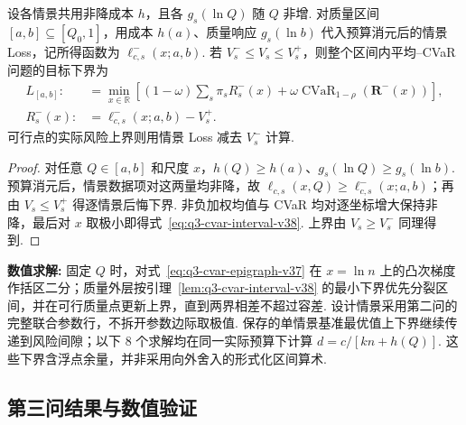 \begin{lemma}\label{lem:q3-cvar-interval-v38}
    设各情景共用非降成本 $h$，且各 $g_s(\ln Q)$ 随 $Q$ 非增. 对质量区间 $[a,b]\subseteq[Q_0,1]$，用成本 $h(a)$、质量响应 $g_s(\ln b)$ 代入预算消元后的情景 Loss，记所得函数为 $\ell^-_{c,s}(x;a,b)$. 若 $V_s^-\le V_s\le V_s^+$，则整个区间内平均--CVaR 问题的目标下界为
    \begin{subequations}\label{eq:q3-cvar-interval-v38}
      \begin{align}
        L_{[a,b]}:&=\min_{x\in\mathbb R}\left[(1-\omega)\sum_s\pi_sR_s^-(x)
        +\omega\operatorname{CVaR}_{1-\rho}({\boldsymbol R^-}(x))\right],\\
         R_s^-(x):&=\ell^-_{c,s}(x;a,b)-V_s^+.
        \end{align}
    \end{subequations}
    可行点的实际风险上界则用情景 Loss 减去 $V_s^-$ 计算. 
\end{lemma}
\begin{proof}
    对任意 $Q\in[a,b]$ 和尺度 $x$，$h(Q)\ge h(a)$、$g_s(\ln Q)\ge g_s(\ln b)$. 预算消元后，情景数据项对这两量均非降，故 $\ell_{c,s}(x,Q)\ge\ell^-_{c,s}(x;a,b)$；再由 $V_s\le V_s^+$ 得逐情景后悔下界. 非负加权均值与 CVaR 均对逐坐标增大保持非降，最后对 $x$ 取极小即得式~\eqref{eq:q3-cvar-interval-v38}. 上界由 $V_s\ge V_s^-$ 同理得到. 
\end{proof}

\textbf{数值求解:}
固定 $Q$ 时，对式~\eqref{eq:q3-cvar-epigraph-v37} 在 $x=\ln n$ 上的凸次梯度作括区二分；质量外层按引理~\ref{lem:q3-cvar-interval-v38} 的最小下界优先分裂区间，并在可行质量点更新上界，直到两界相差不超过容差. 设计情景采用第二问的完整联合参数行，不拆开参数边际取极值. 保存的单情景基准最优值上下界继续传递到风险间隙；以下 8 个求解均在同一实际预算下计算 $d=c/[kn+h(Q)]$. 这些下界含浮点余量，并非采用向外舍入的形式化区间算术. 


\subsection{第三问结果与数值验证}\label{sec:q3-results}

